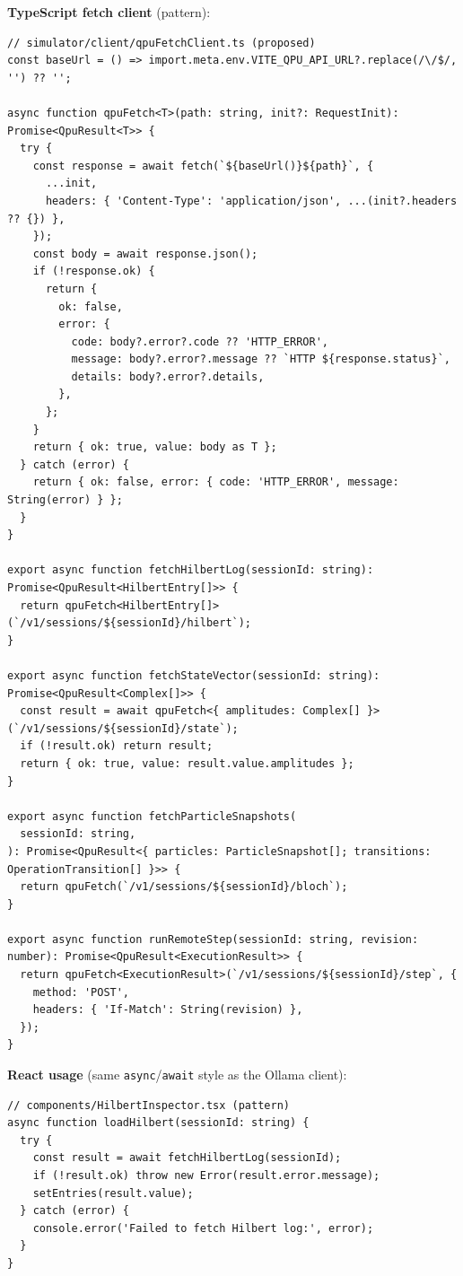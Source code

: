\documentclass[11pt,a4paper]{article}
\begin{document}
\textbf{TypeScript fetch client} (pattern):
\begin{lstlisting}[style=code]
// simulator/client/qpuFetchClient.ts (proposed)
const baseUrl = () => import.meta.env.VITE_QPU_API_URL?.replace(/\/$/, '') ?? '';

async function qpuFetch<T>(path: string, init?: RequestInit): Promise<QpuResult<T>> {
  try {
    const response = await fetch(`${baseUrl()}${path}`, {
      ...init,
      headers: { 'Content-Type': 'application/json', ...(init?.headers ?? {}) },
    });
    const body = await response.json();
    if (!response.ok) {
      return {
        ok: false,
        error: {
          code: body?.error?.code ?? 'HTTP_ERROR',
          message: body?.error?.message ?? `HTTP ${response.status}`,
          details: body?.error?.details,
        },
      };
    }
    return { ok: true, value: body as T };
  } catch (error) {
    return { ok: false, error: { code: 'HTTP_ERROR', message: String(error) } };
  }
}

export async function fetchHilbertLog(sessionId: string): Promise<QpuResult<HilbertEntry[]>> {
  return qpuFetch<HilbertEntry[]>(`/v1/sessions/${sessionId}/hilbert`);
}

export async function fetchStateVector(sessionId: string): Promise<QpuResult<Complex[]>> {
  const result = await qpuFetch<{ amplitudes: Complex[] }>(`/v1/sessions/${sessionId}/state`);
  if (!result.ok) return result;
  return { ok: true, value: result.value.amplitudes };
}

export async function fetchParticleSnapshots(
  sessionId: string,
): Promise<QpuResult<{ particles: ParticleSnapshot[]; transitions: OperationTransition[] }>> {
  return qpuFetch(`/v1/sessions/${sessionId}/bloch`);
}

export async function runRemoteStep(sessionId: string, revision: number): Promise<QpuResult<ExecutionResult>> {
  return qpuFetch<ExecutionResult>(`/v1/sessions/${sessionId}/step`, {
    method: 'POST',
    headers: { 'If-Match': String(revision) },
  });
}
\end{lstlisting}

\textbf{React usage} (same \texttt{async}/\texttt{await} style as the Ollama client):
\begin{lstlisting}[style=code]
// components/HilbertInspector.tsx (pattern)
async function loadHilbert(sessionId: string) {
  try {
    const result = await fetchHilbertLog(sessionId);
    if (!result.ok) throw new Error(result.error.message);
    setEntries(result.value);
  } catch (error) {
    console.error('Failed to fetch Hilbert log:', error);
  }
}
\end{lstlisting}
\end{document}
